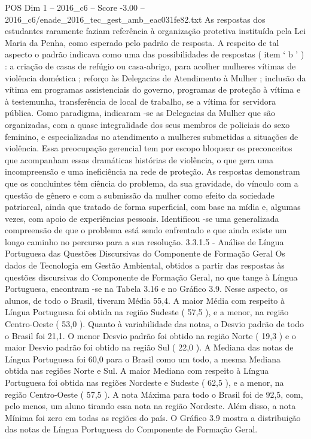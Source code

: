 \begin{textsample}{POS Dim 1 – 2016\_c6 – Score -3.00 – 2016\_c6/enade\_2016\_tec\_gest\_amb\_eac031fe82.txt}
As respostas dos estudantes raramente faziam referência à organização protetiva instituída pela Lei Maria da Penha, como esperado pelo padrão de resposta.
A respeito de tal aspecto o padrão indicava como uma das possibilidades de respostas ( item ‘ b ’ ) : a criação de casas de refúgio ou casa-abrigo, para acolher mulheres vítimas de violência doméstica ; reforço às Delegacias de Atendimento à Mulher ; inclusão da vítima em programas assistenciais do governo, programas de proteção à vítima e à testemunha, transferência de local de trabalho, se a vítima for servidora pública.
Como paradigma, indicaram -se as Delegacias da Mulher que são organizadas, com a quase integralidade dos seus membros de policiais do sexo feminino, e especializadas no atendimento a mulheres submetidas a situações de violência.
Essa preocupação gerencial tem por escopo bloquear os preconceitos que acompanham essas dramáticas histórias de violência, o que gera uma incompreensão e uma ineficiência na rede de proteção.
As respostas demonstram que os concluintes têm ciência do problema, da sua gravidade, do vínculo com a questão de gênero e com a submissão da mulher como efeito da sociedade patriarcal, ainda que tratado de forma superficial, com base na mídia e, algumas vezes, com apoio de experiências pessoais.
Identificou -se uma generalizada compreensão de que o problema está sendo enfrentado e que ainda existe um longo caminho no percurso para a sua resolução. 3.3.1.5 - Análise de Língua Portuguesa das Questões Discursivas do Componente de Formação Geral Os dados de Tecnologia em Gestão Ambiental, obtidos a partir das respostas às questões discursivas do Componente de Formação Geral, no que tange à Língua Portuguesa, encontram -se na Tabela 3.16 e no Gráfico 3.9.
Nesse aspecto, os alunos, de todo o Brasil, tiveram Média 55,4.
A maior Média com respeito à Língua Portuguesa foi obtida na região Sudeste ( 57,5 ), e a menor, na região Centro-Oeste ( 53,0 ).
Quanto à variabilidade das notas, o Desvio padrão de todo o Brasil foi 21,1.
O menor Desvio padrão foi obtido na região Norte ( 19,3 ) e o maior Desvio padrão foi obtido na região Sul ( 22,0 ).
A Mediana das notas de Língua Portuguesa foi 60,0 para o Brasil como um todo, a mesma Mediana obtida nas regiões Norte e Sul.
A maior Mediana com respeito à Língua Portuguesa foi obtida nas regiões Nordeste e Sudeste ( 62,5 ), e a menor, na região Centro-Oeste ( 57,5 ).
A nota Máxima para todo o Brasil foi de 92,5, com, pelo menos, um aluno tirando essa nota na região Nordeste.
Além disso, a nota Mínima foi zero em todas as regiões do país.
O Gráfico 3.9 mostra a distribuição das notas de Língua Portuguesa do Componente de Formação Geral.

\end{textsample}
